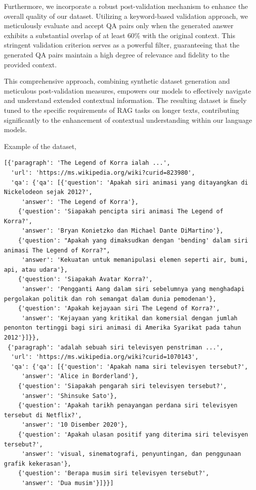 \documentclass[preprint]{article}
\begin{document}
Furthermore, we incorporate a robust post-validation mechanism to enhance the overall quality of our dataset. Utilizing a keyword-based validation approach, we meticulously evaluate and accept QA pairs only when the generated answer exhibits a substantial overlap of at least 60\% with the original context. This stringent validation criterion serves as a powerful filter, guaranteeing that the generated QA pairs maintain a high degree of relevance and fidelity to the provided context.

This comprehensive approach, combining synthetic dataset generation and meticulous post-validation measures, empowers our models to effectively navigate and understand extended contextual information. The resulting dataset is finely tuned to the specific requirements of RAG tasks on longer texts, contributing significantly to the enhancement of contextual understanding within our language models.

Example of the dataset,

\begin{lstlisting}[breaklines=true]
  [{'paragraph': 'The Legend of Korra ialah ...',
  'url': 'https://ms.wikipedia.org/wiki?curid=823980',
  'qa': {'qa': [{'question': 'Apakah siri animasi yang ditayangkan di Nickelodeon sejak 2012?',
     'answer': 'The Legend of Korra'},
    {'question': 'Siapakah pencipta siri animasi The Legend of Korra?',
     'answer': 'Bryan Konietzko dan Michael Dante DiMartino'},
    {'question': "Apakah yang dimaksudkan dengan 'bending' dalam siri animasi The Legend of Korra?",
     'answer': 'Kekuatan untuk memanipulasi elemen seperti air, bumi, api, atau udara'},
    {'question': 'Siapakah Avatar Korra?',
     'answer': 'Pengganti Aang dalam siri sebelumnya yang menghadapi pergolakan politik dan roh semangat dalam dunia pemodenan'},
    {'question': 'Apakah kejayaan siri The Legend of Korra?',
     'answer': 'Kejayaan yang kritikal dan komersial dengan jumlah penonton tertinggi bagi siri animasi di Amerika Syarikat pada tahun 2012'}]}},
 {'paragraph': 'adalah sebuah siri televisyen penstriman ...',
  'url': 'https://ms.wikipedia.org/wiki?curid=1070143',
  'qa': {'qa': [{'question': 'Apakah nama siri televisyen tersebut?',
     'answer': 'Alice in Borderland'},
    {'question': 'Siapakah pengarah siri televisyen tersebut?',
     'answer': 'Shinsuke Sato'},
    {'question': 'Apakah tarikh penayangan perdana siri televisyen tersebut di Netflix?',
     'answer': '10 Disember 2020'},
    {'question': 'Apakah ulasan positif yang diterima siri televisyen tersebut?',
     'answer': 'visual, sinematografi, penyuntingan, dan penggunaan grafik kekerasan'},
    {'question': 'Berapa musim siri televisyen tersebut?',
     'answer': 'Dua musim'}]}}]
\end{lstlisting}
\end{document}
